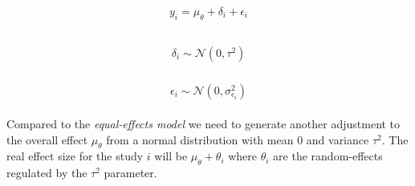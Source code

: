 \documentclass[
  man,floatsintext]{apa6}
\begin{document}
\begin{align}
\begin{aligned}
y_i = \mu_{\theta} + \delta_i + \epsilon_i \\
\label{eq:random-effects-model1}
\end{aligned}
\end{align}

\begin{align}
\begin{aligned}
\delta_i \sim \mathcal{N}(0,\tau^2)
\label{eq:random-effects-model2}
\end{aligned}
\end{align}

\begin{align}
\begin{aligned}
\epsilon_i \sim \mathcal{N}(0,\sigma_{\epsilon_i}^{2})
\label{eq:random-effects-model3}
\end{aligned}
\end{align}

Compared to the \emph{equal-effects model} we need to generate another adjustment to the overall effect \(\mu_{\theta}\) from a normal distribution with mean 0 and variance \(\tau^{2}\). The real effect size for the study \(i\) will be \(\mu_{\theta} + \theta_{i}\) where \(\theta_{i}\) are the random-effects regulated by the \(\tau^{2}\) parameter.

\color{black}

\scriptsize
\end{document}
